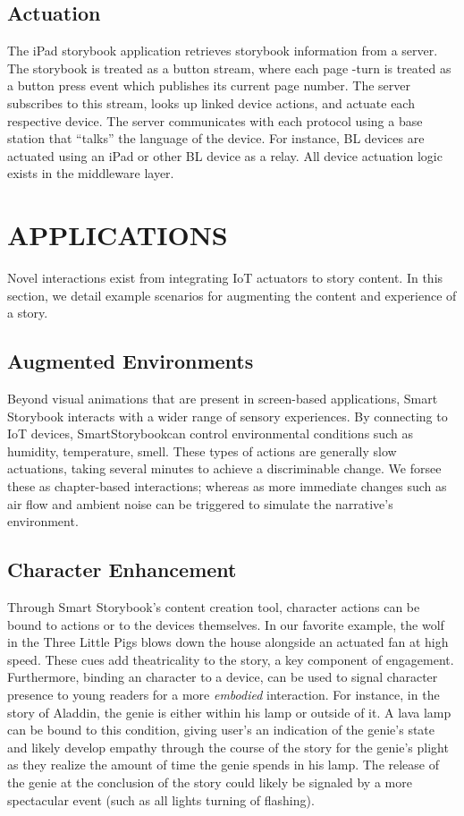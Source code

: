 \documentclass{sigchi}
\newcommand\name{SmartStorybook}
\begin{document}
\subsection{Actuation}
The iPad storybook application retrieves storybook information from a server. The storybook is treated as a button stream, where each page -turn is treated as a button press event which publishes its current page number. The server subscribes to this stream, looks up linked device actions, and actuate each respective device. 
The server communicates with each protocol using a base station that ``talks'' the language of the device. For instance, BL devices are actuated using an iPad or other BL device as a relay. All device actuation logic exists in the middleware layer. 



\section{APPLICATIONS}
Novel interactions exist from integrating IoT actuators to story content. In this section, we detail example scenarios for augmenting the content and experience of a story. 

\subsection{Augmented Environments}
Beyond visual animations that are present in screen-based applications, Smart Storybook interacts with a wider range of sensory experiences. By connecting to IoT devices, \name can control environmental conditions such as humidity, temperature, smell. These types of actions are generally slow actuations, taking several minutes to achieve a discriminable change. We forsee these as chapter-based interactions; whereas as more immediate changes such as air flow and ambient noise can be triggered to simulate the narrative's environment.


\subsection{Character Enhancement}
Through Smart Storybook's content creation tool, character actions can be bound to actions or to the devices themselves. In our favorite example, the wolf in the Three Little Pigs blows down the house alongside an actuated fan at high speed. These cues add theatricality to the story, a key component of engagement. Furthermore, binding an character to a device, can be used to signal character presence to young readers for a more \textit{embodied} interaction. For instance, in the story of Aladdin, the genie is either within his lamp or outside of it. A lava lamp can be bound to this condition, giving user's an indication of the genie's state and likely develop empathy through the course of the story for the genie's plight as they realize the amount of time the genie spends in his lamp. The release of the genie at the conclusion of the story could likely be signaled by a more spectacular event (such as all lights turning of flashing). 
\end{document}
